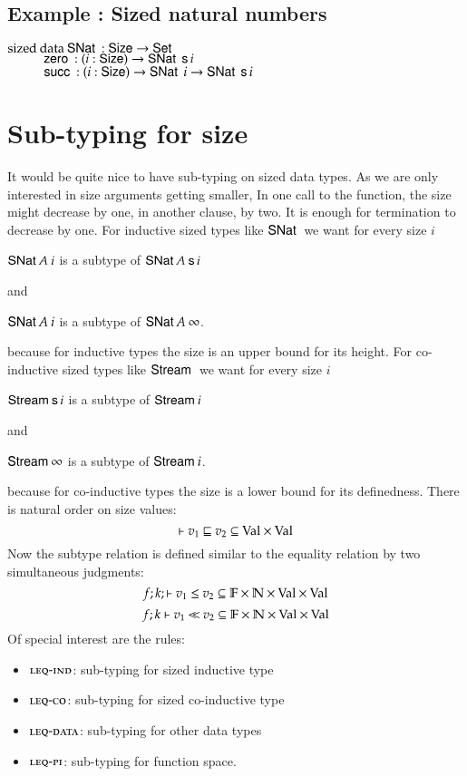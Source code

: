 \subsection{Example : Sized natural numbers}
\begin{bsp}
$\mathrm{sized}\: \mathrm{data}\: \mathsf{SNat}\: : \mathsf{Size} \rightarrow \mathsf{Set} $ \\
$\spcx \zero : \EPi{i}{\Size}{ \SNat \: \s i} $\\
$\spcx \suc : \EPi{i}{\Size}{ \SNat \: i \ra \SNat \: \s i} $
\end{bsp}

\section{Sub-typing for size}
It would be quite nice to have sub-typing on sized data types.
As we are only interested in size arguments getting smaller, 
In one call to the function, the size might decrease by one, in another clause, by two.
It is enough for termination to decrease by one.
For inductive sized types like $\mathsf{SNat}\:$ we want for every size $i$
\begin{bsp}
$\mathsf{SNat}\: A\: i$ is a subtype of $\mathsf{SNat}\: A \: \mathsf{s}\, i$
\end{bsp}
and
\begin{bsp}
$\mathsf{SNat}\: A\: i$ is a subtype of $\mathsf{SNat}\: A \: \infty$.
\end{bsp}
because for inductive types the size is an upper bound for its height.
For co-inductive sized types like $\mathsf{Stream}\:$ we want for every size $i$
\begin{bsp}
$\mathsf{Stream}\: \mathsf{s}\, i $ is a subtype of $\mathsf{Stream}\: i$
\end{bsp}
and
\begin{bsp}
$\mathsf{Stream}\: \infty$ is a subtype of $\mathsf{Stream}\: i$.
\end{bsp}
because for co-inductive types the size is a lower bound for its definedness.
There is natural order on size values: 
\[\vdash v_1\sqsubseteq v_2 \subseteq \mathrm{Val} \times \mathrm{Val} \]
Now the subtype relation is defined similar to the equality relation by two simultaneous judgments:
\[f;k;\vdash v_1\leq v_2 \subseteq \mathbb{F} \times \mathbb{N} \times \mathrm{Val} \times \mathrm{Val} \]
\[f;k\vdash v_1{\:\ll\:}v_2 \subseteq \mathbb{F} \times \mathbb{N} \times\mathrm{Val} \times \mathrm{Val} \]
Of special interest are the rules:
\begin{itemize}
\item
$\mbox{\sc leq-ind}$: sub-typing for sized inductive type 
\item
$\mbox{\sc leq-co}$: sub-typing for sized co-inductive type
\item
$\mbox{\sc leq-data}$: sub-typing for other data types
\item
$\mbox{\sc leq-pi}$: sub-typing for function space. 
\end{itemize}
